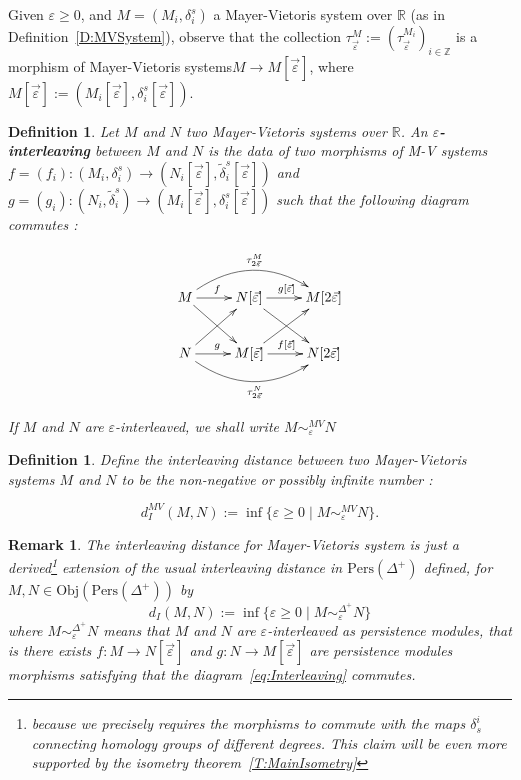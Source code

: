 \documentclass[a4paper, english, 11pt]{article}
\newcommand{\Pe}{\text{Pers}}
\newcommand{\0}{\vec{0}}
\newcommand{\R}[0]{\mathbb{R}}
\newcommand{\Z}[0]{\mathbb{Z}}
\newcommand{\Obj}[0]{\text{Obj}}
\newtheorem{remark}[prop]{Remark}
\newtheorem{defi}[prop]{Definition}
\begin{document}
\smallskip

Given $\varepsilon \geq 0$, and $M = (M_i,\delta_i^s)$ a Mayer-Vietoris system over $\R$ (as in Definition~\ref{D:MVSystem}), observe that the collection $\tau_{\vec{\varepsilon}}^M:=(\tau_{\vec{\varepsilon}}^{M_i})_{i\in\Z}$ is a morphism of Mayer-Vietoris systems$M \longrightarrow M[\vec{\varepsilon}]$, where $M[\vec{\varepsilon}]:=(M_i[\vec{\varepsilon}],\delta_i^s[\vec{\varepsilon}])$.

\begin{defi}
Let $M$ and $N$ two Mayer-Vietoris systems over $\R$. An \textbf{$\varepsilon$-interleaving} between $M$ and $N$ is the data of two morphisms of M-V systems $f = (f_i) : (M_i,\delta_i^s) \longrightarrow (N_i[\vec{\varepsilon}],\tilde{\delta}_i^s [\vec{\varepsilon}])$ and $g = (g_i) : (N_i,\tilde{\delta}_i^s) \longrightarrow (M_i[\vec{\varepsilon}],\delta_i^s[\vec{\varepsilon}]) $ such that the following diagram commutes : 

\begin{equation}\label{eq:Interleaving} \xymatrix{
M  \ar[rd]\ar@/^0.7cm/[rr]^{\tau_{2\vec{\varepsilon}}^M} \ar[r]^{f} & N[\vec{\varepsilon}]  \ar[rd] \ar[r]^{g[\vec{\varepsilon}]} & M[2\vec{\varepsilon}] \\
N  \ar[ur]\ar@/_0.7cm/[rr]_{\tau_{2\vec{\varepsilon}}^N} \ar[r]^{g} & M[\vec{\varepsilon}]  \ar[ur] \ar[r]^{f[\vec{\varepsilon}]} & N[2\vec{\varepsilon}]
   } \end{equation}
   
If $M$ and $N$ are $\varepsilon$-interleaved, we shall write $M\sim_\varepsilon^{MV} N$

\end{defi}



\begin{defi}\label{D:InterleavingforMV}
Define the interleaving distance between two Mayer-Vietoris systems $M$ and $N$ to be the non-negative or possibly infinite number : 

$$d_I^{MV}(M,N) := \inf \{\varepsilon \geq 0 \mid M \sim_\varepsilon^{MV} N  \}. $$
\end{defi}
\begin{remark}\label{R:DMVgeneralizedDstandard}
 The interleaving distance for Mayer-Vietoris system is just a derived\footnote{because we precisely requires the morphisms to commute with the maps $\delta_s^i$ connecting homology groups of different degrees. This claim will be even more supported by the isometry theorem~\ref{T:MainIsometry}} extension of the usual interleaving distance in $\Pe(\Delta^+)$ defined, for $M, N \in \Obj(\Pe(\Delta^+))$ by 
 $$d_I(M,N) := \inf \{\varepsilon \geq 0 \mid M \sim_\varepsilon^{\Delta^+} N  \} $$
 where $M \sim_\varepsilon^{\Delta^+} N$ means that $M$ and $N$ are $\varepsilon$-interleaved as persistence modules, that is there  exists $f: M\to N[\vec{\varepsilon}]$ and $g: N\to M[\vec{\varepsilon}]$ are persistence modules morphisms satisfying that the diagram~\eqref{eq:Interleaving} commutes. 
\end{remark}
\end{document}
